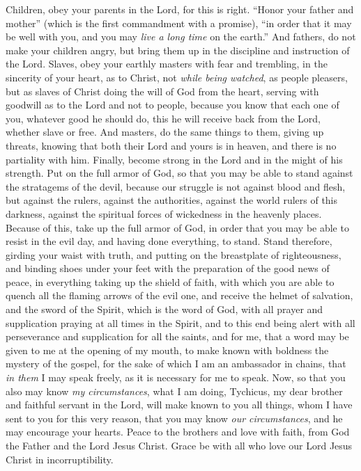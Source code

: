 \begin{biblechapter} %
 Children, obey your parents in the Lord, for this is right.
\verse “Honor your father and mother” (which is the first commandment with a promise),
\verse “in order that it may be well with you, and you may \textit{live a long time} on the earth.”
\verse And fathers, do not make your children angry, but bring them up in the discipline and instruction of the Lord.
 Slaves, obey your earthly masters with fear and trembling, in the sincerity of your heart, as to Christ,
\verse not \textit{while being watched}, as people pleasers, but as slaves of Christ doing the will of God from the heart,
\verse serving with goodwill as to the Lord and not to people,
\verse because you know that each one of you, whatever good he should do, this he will receive back from the Lord, whether slave or free.
\verse And masters, do the same things to them, giving up threats, knowing that both their Lord and yours is in heaven, and there is no partiality with him.
 Finally, become strong in the Lord and in the might of his strength.
\verse Put on the full armor of God, so that you may be able to stand against the stratagems of the devil,
\verse because our struggle is not against blood and flesh, but against the rulers, against the authorities, against the world rulers of this darkness, against the spiritual forces of wickedness in the heavenly places.
\verse Because of this, take up the full armor of God, in order that you may be able to resist in the evil day, and having done everything, to stand.
\verse Stand therefore, girding your waist with truth, and putting on the breastplate of righteousness,
\verse and binding shoes under your feet with the preparation of the good news of peace,
\verse in everything taking up the shield of faith, with which you are able to quench all the flaming arrows of the evil one,
\verse and receive the helmet of salvation, and the sword of the Spirit, which is the word of God,
\verse with all prayer and supplication praying at all times in the Spirit, and to this end being alert with all perseverance and supplication for all the saints,
\verse and for me, that a word may be given to me at the opening of my mouth, to make known with boldness the mystery of the gospel,
\verse for the sake of which I am an ambassador in chains, that \textit{in them} I may speak freely, as it is necessary for me to speak.
 Now, so that you also may know \textit{my circumstances}, what I am doing, Tychicus, my dear brother and faithful servant in the Lord, will make known to you all things,
\verse whom I have sent to you for this very reason, that you may know \textit{our circumstances}, and he may encourage your hearts.
\verse Peace to the brothers and love with faith, from God the Father and the Lord Jesus Christ.
\verse Grace be with all who love our Lord Jesus Christ in incorruptibility.
\end{biblechapter}

